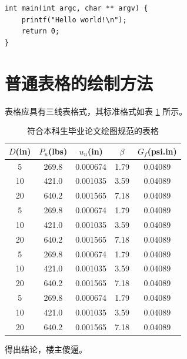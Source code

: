 \documentclass{csexp}
\begin{document}
\begin{lstlisting}
int main(int argc, char ** argv) {
    printf("Hello world!\n");
    return 0;
}
\end{lstlisting}

\section{普通表格的绘制方法}

表格应具有三线表格式，其标准格式如表 \ref{tab:table1} 所示。
\begin{table}[htbp]
    \caption{符合本科生毕业论文绘图规范的表格}\label{tab:table1}
    \vspace{0.5em}\centering
    \begin{tabular}{ccccc}
        \toprule[1.5pt]
        $D$(in) & $P_u$(lbs) & $u_u$(in) & $\beta$ & $G_f$(psi.in) \\
        \midrule[1pt]
        5       & 269.8      & 0.000674  & 1.79    & 0.04089       \\
        10      & 421.0      & 0.001035  & 3.59    & 0.04089       \\
        20      & 640.2      & 0.001565  & 7.18    & 0.04089       \\
        5       & 269.8      & 0.000674  & 1.79    & 0.04089       \\
        10      & 421.0      & 0.001035  & 3.59    & 0.04089       \\
        20      & 640.2      & 0.001565  & 7.18    & 0.04089       \\
        5       & 269.8      & 0.000674  & 1.79    & 0.04089       \\
        10      & 421.0      & 0.001035  & 3.59    & 0.04089       \\
        20      & 640.2      & 0.001565  & 7.18    & 0.04089       \\
        5       & 269.8      & 0.000674  & 1.79    & 0.04089       \\
        10      & 421.0      & 0.001035  & 3.59    & 0.04089       \\
        20      & 640.2      & 0.001565  & 7.18    & 0.04089       \\
        \bottomrule[1.5pt]
    \end{tabular}
    \vspace{\baselineskip}
\end{table}


得出结论，楼主傻逼。
\end{document}
